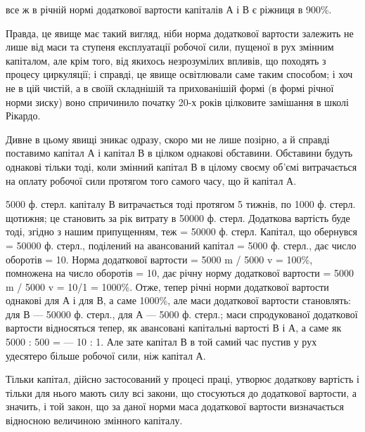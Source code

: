 \parcont{}  %
все ж в річній нормі додаткової вартости капіталів А і В є ріжниця в
900\%.

Правда, це явище має такий вигляд, ніби норма додаткової вартости
залежить не лише від маси та ступеня експлуатації робочої сили,
пущеної в рух змінним капіталом, але крім того, від якихось незрозумілих
впливів, що походять з процесу циркуляції; і справді, це явище
освітлювали саме таким способом; і хоч не в цій чистій, а в своїй складнішій
та прихованішій формі (в формі річної норми зиску) воно спричинило
початку 20-х років цілковите замішання в школі Рікардо.

Дивне в цьому явищі зникає одразу, скоро ми не лише позірно, а
й справді поставимо капітал А і капітал В в цілком однакові обставини.
Обставини будуть однакові тільки тоді, коли змінний капітал В в цілому
своєму об’ємі витрачається на оплату робочої сили протягом того
самого часу, що й капітал А.

5000 ф. стерл. капіталу В витрачається тоді протягом 5 тижнів, по
1000 ф. стерл. щотижня; це становить за рік витрату в 50000 ф. стерл.
Додаткова вартість буде тоді, згідно з нашим припущенням, теж = 50000
ф. стерл. Капітал, що обернувся = 50000 ф. стерл., поділений на авансований
капітал = 5000 ф. стерл., дає число оборотів = 10. Норма додаткової
вартости = 5000 m / 5000 v = 100\%, помножена на число оборотів = 10, дає річну норму додаткової
вартости = 5000 m / 5000 v = 10/1 = 1000\%. Отже, тепер річні норми додаткової вартости однакові для
А і для В, а саме
1000\%, але маси додаткової вартости становлять: для В — 50000 ф. стерл.,
для А — 5000 ф. стерл.; маси спродукованої додаткової вартости відносяться
тепер, як авансовані капітальні вартості В і А, а саме як 5000 : 500 =
— 10 : 1. Але зате капітал В в той самий час пустив у рух удесятеро
більше робочої сили, ніж капітал А.

Тільки капітал, дійсно застосований у процесі праці, утворює додаткову
вартість і тільки для нього мають силу всі закони, що стосуються
до додаткової вартости, а значить, і той закон, що за даної норми маса
додаткової вартости визначається відносною величиною змінного капіталу.

